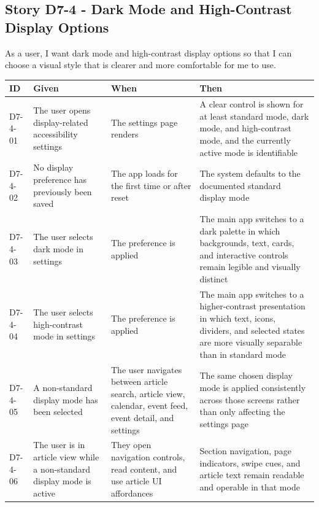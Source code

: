 \documentclass[a4paper, 12pt]{article}
\begin{document}
    \subsection{Story D7-4 - Dark Mode and High-Contrast Display Options}

    As a user, I want dark mode and high-contrast display options so that I can choose
    a visual style that is clearer and more comfortable for me to use.

    \begin{longtable}
        {|L{0.12\textwidth}|L{0.24\textwidth}|L{0.24\textwidth}|L{0.32\textwidth}|}
        \hline \textbf{ID} & \textbf{Given} & \textbf{When} & \textbf{Then} \\
        \hline \endhead D7-4-01 & The user opens display-related accessibility settings
        & The settings page renders & A clear control is shown for at least standard
        mode, dark mode, and high-contrast mode, and the currently active mode
        is identifiable \\
        \hline D7-4-02 & No display preference has previously been saved & The
        app loads for the first time or after reset & The system defaults to the
        documented standard display mode \\
        \hline D7-4-03 & The user selects dark mode in settings & The preference
        is applied & The main app switches to a dark palette in which
        backgrounds, text, cards, and interactive controls remain legible and visually
        distinct \\
        \hline D7-4-04 & The user selects high-contrast mode in settings & The preference
        is applied & The main app switches to a higher-contrast presentation in which
        text, icons, dividers, and selected states are more visually separable
        than in standard mode \\
        \hline D7-4-05 & A non-standard display mode has been selected & The
        user navigates between article search, article view, calendar, event feed,
        event detail, and settings & The same chosen display mode is applied consistently
        across those screens rather than only affecting the settings page \\
        \hline D7-4-06 & The user is in article view while a non-standard display
        mode is active & They open navigation controls, read content, and use article
        UI affordances & Section navigation, page indicators, swipe cues, and
        article text remain readable and operable in that mode \\

\end{longtable}
\end{document}
